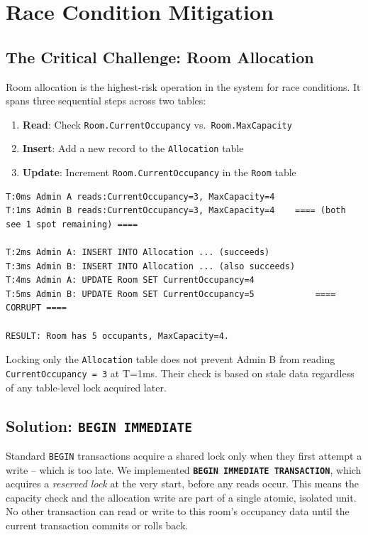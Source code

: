 \documentclass[sigconf]{acmart}
\begin{document}
\section{Race Condition Mitigation}

\subsection{The Critical Challenge: Room Allocation}

Room allocation is the highest-risk operation in the system for race conditions. It spans three sequential steps across two tables:

\begin{enumerate}[leftmargin=*]
    \item \textbf{Read}: Check \texttt{Room.CurrentOccupancy} vs.\ \texttt{Room.MaxCapacity}
    \item \textbf{Insert}: Add a new record to the \texttt{Allocation} table
    \item \textbf{Update}: Increment \texttt{Room.CurrentOccupancy} in the \texttt{Room} table
\end{enumerate}

\begin{lstlisting}[style=logstyle, caption={Race timeline (without BEGIN IMMEDIATE)}]
T:0ms Admin A reads:CurrentOccupancy=3, MaxCapacity=4
T:1ms Admin B reads:CurrentOccupancy=3, MaxCapacity=4    ==== (both see 1 spot remaining) ====
         
T:2ms Admin A: INSERT INTO Allocation ... (succeeds)
T:3ms Admin B: INSERT INTO Allocation ... (also succeeds)
T:4ms Admin A: UPDATE Room SET CurrentOccupancy=4
T:5ms Admin B: UPDATE Room SET CurrentOccupancy=5            ==== CORRUPT ====

RESULT: Room has 5 occupants, MaxCapacity=4.            
\end{lstlisting}

Locking only the \texttt{Allocation} table does not prevent Admin B from reading \texttt{CurrentOccupancy = 3} at T=1ms. Their check is based on stale data regardless of any table-level lock acquired later.

\subsection{Solution: \texttt{BEGIN IMMEDIATE}}

Standard \texttt{BEGIN} transactions acquire a shared lock only when they first attempt a write -- which is too late. We implemented \textbf{\texttt{BEGIN IMMEDIATE TRANSACTION}}, which acquires a \textit{reserved lock} at the very start, before any reads occur. This means the capacity check and the allocation write are part of a single atomic, isolated unit. No other transaction can read or write to this room's occupancy data until the current transaction commits or rolls back.
\end{document}
